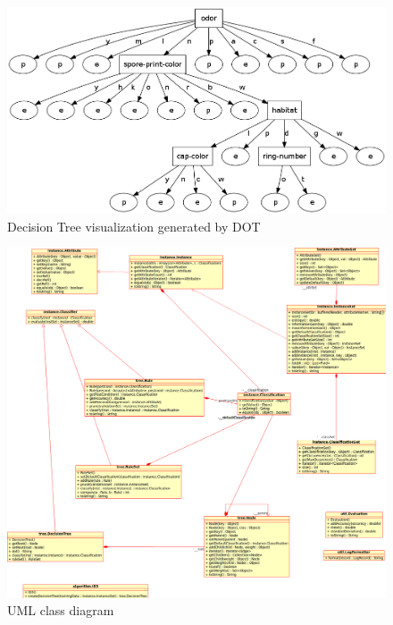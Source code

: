 \documentclass[10pt]{report}
\begin{document}
\begin{figure}
  \begin{center}
	\includegraphics[angle=90,width=!,height=0.90\textheight]{mushroom}
  \end{center}
  \caption{Decision Tree visualization generated by DOT}
  \label{fig:dot}
\end{figure} 

\begin{figure}
  \begin{center}
	\includegraphics[angle=90,width=\textwidth,height=!]{uml}
  \end{center}
  \caption{UML class diagram}
  \label{fig:uml}
\end{figure} 
\end{document}
